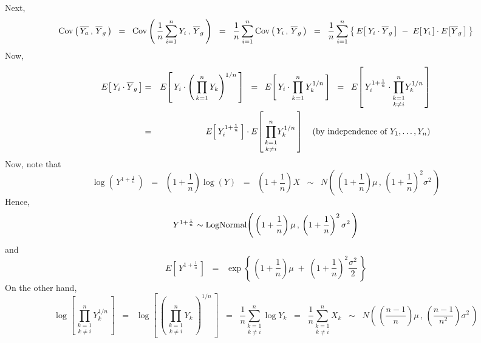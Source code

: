 Next,
\begin{equation*}
\textnormal{Cov}\left(\,\overline{Y_{a}}\,,\,\overline{Y}_{g}\,\right)
\;\;=\;\;
\textnormal{Cov}\left(\,
\dfrac{1}{n}\sum_{i=1}^{n}Y_{i}
\,,\,
\overline{Y}_{g}
\,\right)
\;\;=\;\;
\dfrac{1}{n}\sum_{i=1}^{n}
\textnormal{Cov}\left(\,
Y_{i}
\,,\,
\overline{Y}_{g}
\,\right)
\;\;=\;\;
\dfrac{1}{n}\sum_{i=1}^{n}
\left\{\,
E\!\left[\,Y_{i}\cdot \overline{Y}_{g}\,\right]
\;-\;
E\!\left[\,Y_{i}\,\right]\cdot E\!\left[\overline{Y}_{g}\,\right]
\,\right\}
\end{equation*}
Now,
\begin{eqnarray*}
          E\!\left[\,Y_{i}\cdot \overline{Y}_{g}\,\right]
&=&       E\!\left[\,Y_{i}\cdot \left(\,\prod_{k=1}^{n}Y_{k}\right)^{1/n} \,\right]
\;\;=\;\; E\!\left[\,Y_{i}\cdot \prod_{k=1}^{n}Y_{k}^{1/n} \,\right]
\;\;=\;\; E\!\left[\,Y_{i}^{1+\frac{1}{n}}\cdot \underset{k \neq i}{\prod_{k=1}^{n}}Y_{k}^{1/n} \,\right] \\
&=&       E\!\left[\,Y_{i}^{1+\frac{1}{n}}\,\right]
          \cdot
          E\!\left[\,\underset{k \neq i}{\prod_{k=1}^{n}}Y_{k}^{1/n} \,\right]
          \quad\textnormal{(by independence of $Y_{1},\ldots,Y_{n}$)} \\
\end{eqnarray*}
Now, note that
\begin{equation*}
\log\left(\,Y^{1+\frac{1}{n}}\,\right)
\;\;=\;\;
\left(1+\dfrac{1}{n}\right)\log(Y)
\;\;=\;\;
\left(1+\dfrac{1}{n}\right)X
\;\;\sim\;\;
N\!\left(\,\left(1+\dfrac{1}{n}\right)\mu\,,\,\left(1+\dfrac{1}{n}\right)^{2}\sigma^{2}\,\right)
\end{equation*}
Hence,
\begin{equation*}
Y^{1+\frac{1}{n}} \sim
\textnormal{LogNormal}
\!\left(\,\left(1+\dfrac{1}{n}\right)\mu\,,\,\left(1+\dfrac{1}{n}\right)^{2}\sigma^{2}\,\right)
\end{equation*}
and
\begin{equation*}
E\!\left[\,Y^{1+\frac{1}{n}}\,\right]
\;\; = \;\;
\exp\!\left\{\,
\left(1+\frac{1}{n}\right)\mu
\;+\;
\left(1+\frac{1}{n}\right)^{2}\dfrac{\sigma^{2}}{2}
\,\right\}
\end{equation*}
On the other hand,
\begin{equation*}
\log\!\left[\,\underset{k \neq i}{\prod_{k=1}^{n}}Y_{k}^{1/n} \,\right]
\;\;=\;\;
\log\!\left[\,\left(\,\underset{k \neq i}{\prod_{k=1}^{n}}Y_{k}\,\right)^{1/n} \,\right]
\;\;=\;\; \dfrac{1}{n} \underset{k\neq i}{\sum_{k=1}^{n}}\log Y_{k}
\;\;=\;\; \dfrac{1}{n} \underset{k\neq i}{\sum_{k=1}^{n}}X_{k}
\;\;\sim\;\;
N\!\left(\,\left(\dfrac{n-1}{n}\right)\mu\,,\,\left(\dfrac{n-1}{n^{2}}\right)\sigma^{2}\,\right)
\end{equation*}
